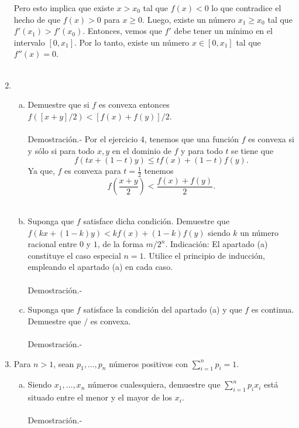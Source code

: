 \begin{enumerate}[\bfseries 1.]
	Pero esto implica que existe $x>x_0$ tal que $f(x)<0$ lo que contradice el hecho de que $f(x)>0$ para $x\geq 0$. Luego, existe un número $x_1\geq x_0$ tal que $f'(x_1)>f'(x_0)$. Entonces, vemos que $f'$ debe tener un mínimo en el intervalo $[0,x_1]$. Por lo tanto, existe un número $x\in [0,x_1]$ tal que $f''(x)=0$.\\\\


    \item 
	\begin{enumerate}[(a)]

	    \item Demuestre que si $f$ es convexa entonces $f([x + y]/2)<[f(x) + f(y )]/2$.\\\\
		Demostración.-\; Por el ejercicio 4, tenemos que una función $f$ es convexa si y sólo si para todo $x,y$ en el dominio de $f$ y para todo $t$ se tiene que 
		$$f(tx+(1-t)y)\leq tf(x)+(1-t)f(y).$$
		Ya que, $f$ es convexa para $t=\frac{1}{2}$ tenemos
		$$f\left(\dfrac{x+y}{2}\right)<\dfrac{f(x)+f(y)}{2}.$$\\

	    \item Suponga que $f$ satisface dicha condición. Demuestre que $f(kx + (1-k)y)<kf(x) + (1-k)f(y)$ siendo $k$ un número racional entre $0$ y $1$, de la forma $m/2^n$. Indicación: El apartado (a) constituye el caso especial $n = 1$. Utilice el principio de inducción, empleando el apartado (a) en cada caso.\\\\
		Demostración.-\;

	    \item Suponga que $f$ satisface la condición del apartado (a) y que $f$ es continua. Demuestre que $/$ es convexa.\\\\
		Demostración.-\;

	\end{enumerate}

    \item Para $n>1$, sean $p_1, \ldots , p_n$ números positivos con $\displaystyle\sum_{i=1}^n p_i=1$.

	\begin{enumerate}[(a)]

	    \item Siendo $x_1,\ldots,x_n$ números cualesquiera, demuestre que $\displaystyle\sum_{i=1}^n p_ix_i$ está situado entre el menor y el mayor de los $x_i$.\\\\
		Demostración.-\;


\end{enumerate}
\end{enumerate}
